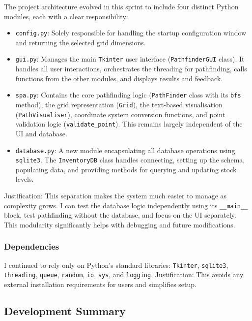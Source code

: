 The project architecture evolved in this sprint to include four distinct Python modules, each with a clear responsibility:
\begin{itemize}
	\item \verb|config.py|: Solely responsible for handling the startup configuration window and returning the selected grid dimensions.
	\item \verb|gui.py|: Manages the main \verb|Tkinter| user interface (\verb|PathfinderGUI| class). It handles all user interactions, orchestrates the threading for pathfinding, calls functions from the other modules, and displays results and feedback.
	\item \verb|spa.py|: Contains the core pathfinding logic (\verb|PathFinder| class with its \verb|bfs| method), the grid representation (\verb|Grid|), the text-based visualisation (\verb|PathVisualiser|), coordinate system conversion functions, and point validation logic (\verb|validate_point|). This remains largely independent of the UI and database.
	\item \verb|database.py|: A new module encapsulating all database operations using \verb|sqlite3|. The \verb|InventoryDB| class handles connecting, setting up the schema, populating data, and providing methods for querying and updating stock levels.
\end{itemize}
Justification: This separation makes the system much easier to manage as complexity grows. I can test the database logic independently using its \verb|__main__| block, test pathfinding without the database, and focus on the UI separately. This modularity significantly helps with debugging and future modifications.

\subsubsection{Dependencies}
I continued to rely only on Python's standard libraries: \verb|Tkinter|, \verb|sqlite3|, \verb|threading|, \verb|queue|, \verb|random|, \verb|io|, \verb|sys|, and \verb|logging|. Justification: This avoids any external installation requirements for users and simplifies setup.

\subsection{Development Summary}


